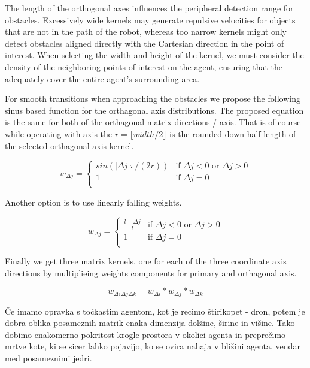 \documentclass[letterpaper, 10 pt, conference]{ieeeconf}  %
\begin{document}
The length of the orthogonal axes influences the peripheral detection range for obstacles. Excessively wide kernels may generate repulsive velocities for objects that are not in the path of the robot, whereas too narrow kernels might only detect obstacles aligned directly with the Cartesian direction in the point of interest. When selecting the width and height of the kernel, we must consider the density of the neighboring points of interest on the agent, ensuring that the  adequately cover the entire agent's surrounding area. 

For smooth transitions when approaching the obstacles we propose the following sinus based function for the orthagonal axis distributions. The proposed equation is the same for both of the orthagonal matrix directions / axis. That is of course while operating with axis the $r=\lfloor width / 2 \rfloor$ is the rounded down half length of the selected orthagonal axis kernel.

\begin{equation}
	w_{\Delta j} =
	\begin{cases} 
		sin(\left| \Delta j \right| \pi / (2 r)) & \text{if } \Delta j < 0 \text{~or }  \Delta j > 0 \\
		1 & \text{if } \Delta j = 0 \\
	\end{cases}
\end{equation}

Another option is to use linearly falling weights.

\begin{equation}
	w_{\Delta j} =
	\begin{cases} 
		\frac{l - \Delta j }{l} & \text{if } \Delta j < 0 \text{~or }  \Delta j > 0 \\
		1 & \text{if } \Delta j = 0 \\
	\end{cases}
\end{equation}


Finally we get three matrix kernels, one for each of the three coordinate axis directions by multiplieing weights components for primary and orthagonal axis.

\begin{equation}
	w_{\Delta i \Delta j \Delta k} = w_{\Delta i} * w_{\Delta j} * w_{\Delta k}
\end{equation}

Če imamo opravka s točkastim agentom, kot je recimo štirikopet - dron, potem je dobra oblika posameznih matrik enaka dimenzija dolžine, širine in višine. Tako dobimo enakomerno pokritost krogle prostora v okolici agenta in preprečimo mrtve kote, ki se sicer lahko pojavijo, ko se ovira nahaja v bližini agenta, vendar med posameznimi jedri. 
\end{document}
